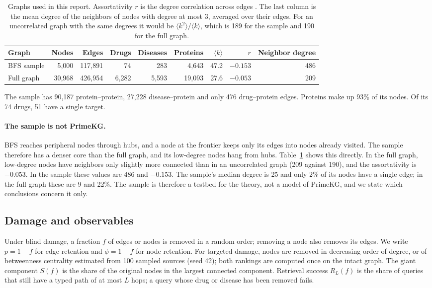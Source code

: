 \begin{table}[!htbp]
\centering
\small
\caption{Graphs used in this report. Assortativity $r$ is the degree
correlation across edges \cite{newman2002assortative}. The last column is the mean degree of the neighbors of nodes with degree at most 3, averaged over
their edges. For an uncorrelated graph with the same degrees it would be
$\langle k^2\rangle/\langle k\rangle$, which is 189 for the sample and 190 for the full graph.}
\label{tab:graphs}
\begin{tabular}{@{}lrrrrrrrr@{}}
\toprule
Graph & Nodes & Edges & Drugs & Diseases & Proteins & $\langle k\rangle$ & $r$ & Neighbor degree \\
\midrule
BFS sample & 5,000 & 117,891 & 74 & 283 & 4,643 & 47.2 & $-0.153$ & 486 \\
Full graph & 30,968 & 426,954 & 6,282 & 5,593 & 19,093 & 27.6 & $-0.053$ & 209 \\
\bottomrule
\end{tabular}
\end{table}

The sample has 90,187 protein--protein, 27,228 disease--protein and
only 476 drug--protein edges. Proteins make up 93\% of its nodes. Of its 74
drugs, 51 have a single target.

\paragraph{The sample is not PrimeKG.} BFS reaches peripheral nodes through
hubs, and a node at the frontier keeps only its edges into nodes already
visited. The sample therefore has a denser core than the full graph, and its
low-degree nodes hang from hubs. Table~\ref{tab:graphs} shows this directly. In
the full graph, low-degree nodes have neighbors only slightly more connected
than in an uncorrelated graph (209 against 190), and the assortativity is
$-0.053$. In the sample these values are 486 and $-0.153$. The sample's median
degree is 25 and only 2\% of its nodes have a single edge; in the full graph
these are 9 and 22\%. The sample is therefore a testbed for the theory, not a
model of PrimeKG, and we state which conclusions concern it only.

\subsection{Damage and observables}
\label{sec:data-damage}

Under blind damage, a fraction $f$ of edges or nodes is removed in a random
order; removing a node also removes its edges. We write $p=1-f$ for edge
retention and $\phi=1-f$ for node retention. For targeted damage, nodes are
removed in decreasing order of degree, or of betweenness centrality estimated
from 100 sampled sources (seed 42); both rankings are computed once on the
intact graph. The giant component $S(f)$ is the share of the original nodes in
the largest connected component. Retrieval success $R_L(f)$ is the share of
queries that still have a typed path of at most $L$ hops; a query whose drug or
disease has been removed fails.

